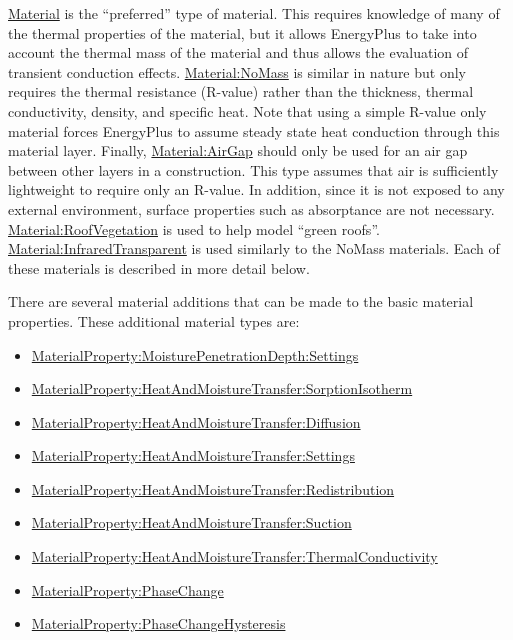 \hyperref[material]{Material} is the ``preferred'' type of material. This requires knowledge of many of the thermal properties of the material, but it allows EnergyPlus to take into account the thermal mass of the material and thus allows the evaluation of transient conduction effects. \hyperref[materialnomass]{Material:NoMass} is similar in nature but only requires the thermal resistance (R-value) rather than the thickness, thermal conductivity, density, and specific heat. Note that using a simple R-value only material forces EnergyPlus to assume steady state heat conduction through this material layer. Finally, \hyperref[materialairgap]{Material:AirGap} should only be used for an air gap between other layers in a construction. This type assumes that air is sufficiently lightweight to require only an R-value. In addition, since it is not exposed to any external environment, surface properties such as absorptance are not necessary. \hyperref[materialroofvegetation]{Material:RoofVegetation} is used to help model ``green roofs''. \hyperref[materialinfraredtransparent]{Material:InfraredTransparent} is used similarly to the NoMass materials. Each of these materials is described in more detail below.

There are several material additions that can be made to the basic material properties. These additional material types are:

\begin{itemize}
\item
  \hyperref[materialpropertymoisturepenetrationdepthsettings]{MaterialProperty:MoisturePenetrationDepth:Settings}
\item
  \hyperref[materialpropertyheatandmoisturetransfersorptionisotherm]{MaterialProperty:HeatAndMoistureTransfer:SorptionIsotherm}
\item
  \hyperref[materialpropertyheatandmoisturetransferdiffusion]{MaterialProperty:HeatAndMoistureTransfer:Diffusion}
\item
  \hyperref[materialpropertyheatandmoisturetransfersettings]{MaterialProperty:HeatAndMoistureTransfer:Settings}
\item
  \hyperref[materialpropertyheatandmoisturetransferredistribution]{MaterialProperty:HeatAndMoistureTransfer:Redistribution}
\item
  \hyperref[materialpropertyheatandmoisturetransfersuction]{MaterialProperty:HeatAndMoistureTransfer:Suction}
\item
  \hyperref[materialpropertyheatandmoisturetransferthermalconductivity]{MaterialProperty:HeatAndMoistureTransfer:ThermalConductivity}
\item
  \hyperref[materialpropertyphasechange]{MaterialProperty:PhaseChange}
\item
  \hyperref[materialpropertyphasechangehysteresis]{MaterialProperty:PhaseChangeHysteresis}
\end{itemize}

